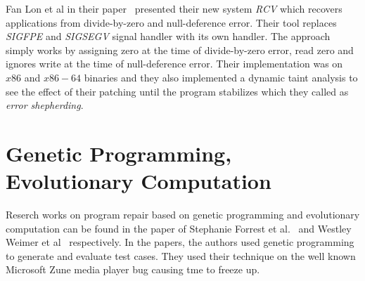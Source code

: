 Fan Lon et al in their paper~\cite{conf/pldi/LongSR14} presented their new
system \emph{RCV} which recovers applications from divide-by-zero and
null-deference error. Their tool replaces \emph{SIGFPE} and \emph{SIGSEGV}
signal handler with its own handler. The approach simply works by assigning
zero at the time of divide-by-zero error, read zero and ignores write at the time
of null-deference error. Their implementation was on $x86$ and $x86-64$
binaries and they also implemented a dynamic taint analysis to see the effect of their
patching until the program stabilizes which they called as \emph{error
shepherding}.

\section{Genetic Programming, Evolutionary Computation}
\label{sec:RecWorksGeneric}

Reserch works on program repair based on genetic programming and evolutionary
computation can be found in the paper of Stephanie Forrest et
al.~\cite{conf/gecco/2009g} and Westley Weimer et
al~\cite{DBLP:journals/cacm/WeimerFGN10} respectively. In the papers, the
authors used genetic programming to generate and evaluate test cases. They used
their technique on the well known Microsoft Zune media player bug causing tme
to freeze up.



